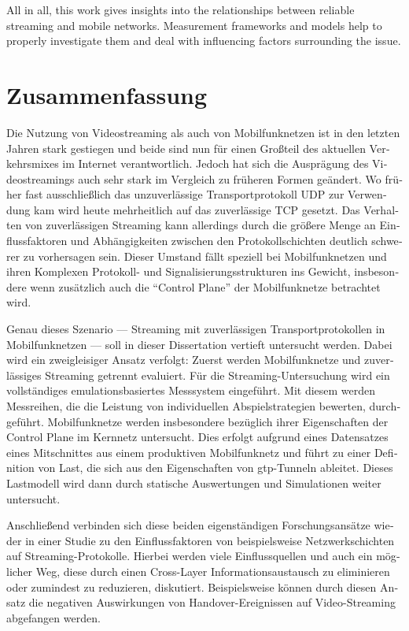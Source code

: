 All in all, this work gives insights into the relationships between reliable streaming and mobile networks. Measurement frameworks and models help to properly investigate them and deal with influencing factors surrounding the issue.


\chapter*{Zusammenfassung}
\begin{german}
Die Nutzung von Videostreaming als auch von Mobilfunknetzen ist in den letzten Jahren stark gestiegen und beide sind nun für einen Großteil des aktuellen Verkehrsmixes im Internet verantwortlich. Jedoch hat sich die Ausprägung des Videostreamings auch sehr stark im Vergleich zu früheren Formen geändert. Wo früher fast ausschließlich das unzuverlässige Transportprotokoll \acrshort{UDP} zur Verwendung kam wird heute mehrheitlich auf das zuverlässige \acrshort{TCP} gesetzt. Das Verhalten von zuverlässigen Streaming kann allerdings durch die größere Menge an Einflussfaktoren und Abhängigkeiten zwischen den Protokollschichten deutlich schwerer zu vorhersagen sein. Dieser Umstand fällt speziell bei Mobilfunknetzen und ihren Komplexen Protokoll- und Signalisierungsstrukturen ins Gewicht, insbesondere wenn zusätzlich auch die ``Control Plane'' der Mobilfunknetze betrachtet wird.

Genau dieses Szenario --- Streaming mit zuverlässigen Transportprotokollen in Mobilfunknetzen --- soll in dieser Dissertation vertieft untersucht werden. Dabei wird ein zweigleisiger Ansatz verfolgt: Zuerst werden Mobilfunknetze und zuverlässiges Streaming getrennt evaluiert. Für die Streaming-Untersuchung wird ein vollständiges emulationsbasiertes Messsystem eingeführt. Mit diesem werden Messreihen, die die Leistung von individuellen Abspielstrategien bewerten, durchgeführt. Mobilfunknetze werden insbesondere bezüglich ihrer Eigenschaften der Control Plane im Kernnetz untersucht. Dies erfolgt aufgrund eines Datensatzes eines Mitschnittes aus einem produktiven Mobilfunknetz und führt zu einer Definition von Last, die sich aus den Eigenschaften von \acrshort{gtp}-Tunneln ableitet. Dieses Lastmodell wird dann durch statische Auswertungen und Simulationen weiter untersucht.

Anschließend verbinden sich diese beiden eigenständigen Forschungsansätze wieder in einer Studie zu den Einflussfaktoren von beispielsweise Netzwerkschichten auf Streaming-Protokolle. Hierbei werden viele Einflussquellen und auch ein möglicher Weg, diese durch einen Cross-Layer Informationsaustausch zu eliminieren oder zumindest zu reduzieren, diskutiert. Beispielsweise können durch diesen Ansatz die negativen Auswirkungen von Handover-Ereignissen auf Video-Streaming abgefangen werden.


\end{german}
